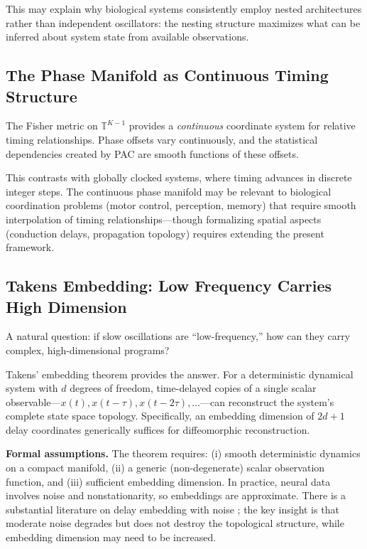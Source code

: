 \documentclass[12pt]{article}
\newcommand{\T}{\mathbb{T}}
\begin{document}
This may explain why biological systems consistently employ nested architectures rather than independent oscillators: the nesting structure maximizes what can be inferred about system state from available observations.

\subsection{The Phase Manifold as Continuous Timing Structure}

The Fisher metric on $\T^{K-1}$ provides a \emph{continuous} coordinate system for relative timing relationships. Phase offsets vary continuously, and the statistical dependencies created by PAC are smooth functions of these offsets.

This contrasts with globally clocked systems, where timing advances in discrete integer steps. The continuous phase manifold may be relevant to biological coordination problems (motor control, perception, memory) that require smooth interpolation of timing relationships---though formalizing spatial aspects (conduction delays, propagation topology) requires extending the present framework.

\subsection{Takens Embedding: Low Frequency Carries High Dimension}

A natural question: if slow oscillations are ``low-frequency,'' how can they carry complex, high-dimensional programs?

Takens' embedding theorem \citep{takens1981} provides the answer. For a deterministic dynamical system with $d$ degrees of freedom, time-delayed copies of a single scalar observable---$x(t), x(t-\tau), x(t-2\tau), \ldots$---can reconstruct the system's complete state space topology. Specifically, an embedding dimension of $2d+1$ delay coordinates generically suffices for diffeomorphic reconstruction.

\textbf{Formal assumptions.} The theorem requires: (i) smooth deterministic dynamics on a compact manifold, (ii) a generic (non-degenerate) scalar observation function, and (iii) sufficient embedding dimension. In practice, neural data involves noise and nonstationarity, so embeddings are approximate. There is a substantial literature on delay embedding with noise \citep{casdagli1991state}; the key insight is that moderate noise degrades but does not destroy the topological structure, while embedding dimension may need to be increased.
\end{document}

